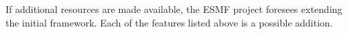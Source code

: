 If additional resources are made available, the ESMF project foresees
extending the initial framework.  Each of the features listed above is
a possible addition.





















